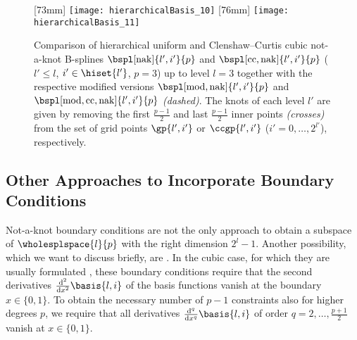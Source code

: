 \begin{figure}
  [73mm]{%
    \texttt{[image: hierarchicalBasis\_10]}%
  }%
  \hfill
  [76mm]{%
    \texttt{[image: hierarchicalBasis\_11]}%
  }%
  \caption[%
    Comparison of hierarchical not-a-knot B-splines%
  ]{%
    Comparison of hierarchical uniform and Clenshaw--Curtis cubic not-a-knot
    B-splines $\bspl[\nak]{l',i'}{p}$ and
    $\bspl[\cc,\nak]{l',i'}{p}$
    ($l ' \le l$, $i' \in \hiset{l'}$, $p = 3$) up to level $l = 3$
    together with the respective modified versions
    $\bspl[\modified,\nak]{l',i'}{p}$ and
    $\bspl[\modified,\cc,\nak]{l',i'}{p}$
    \emph{(dashed)}.
    The knots of each level $l'$ are given by removing the
    first $\tfrac{p-1}{2}$ and last $\tfrac{p-1}{2}$
    inner points \emph{(crosses)}
    from the set of grid points $\gp{l',i'}$ or
    $\ccgp{l',i'}$
    ($i' = 0, \dotsc, 2^{l'}$), respectively.%
  }%
  \label{fig:uniformAndClenshawCurtisNotAKnotBSpline}%
\end{figure}



\subsection{Other Approaches to Incorporate Boundary Conditions}
\label{sec:324naturalBoundary}

Not-a-knot boundary conditions are not the only approach
to obtain a subspace of $\wholesplspace{l}{p}$ with the right dimension $2^l - 1$.
Another possibility, which we want to discuss briefly, are
.
In the cubic case, for which they are usually formulated
\cite{Hoellig13Approximation},
these boundary conditions require that the
second derivatives $\frac{\diff^2}{\dx^2} \basis{l,i}$ of the
basis functions vanish at the boundary $x \in \{0, 1\}$.
To obtain the necessary number of $p - 1$ constraints also
for higher degrees $p$,
we require that all derivatives
$\frac{\diff^q}{\dx^q} \basis{l,i}$ of order
$q = 2, \dotsc, \tfrac{p+1}{2}$ vanish at $x \in \{0, 1\}$.

